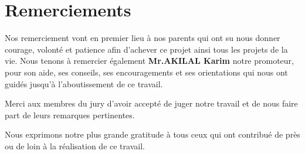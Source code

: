 \chapter*{Remerciements}
\thispagestyle{empty}
\begin{it}
\begin{center}
  Nos remerciement vont en premier lieu  à nos parents qui ont su nous donner courage, volonté et patience afin d'achever ce projet ainsi tous les projets de la vie.\newline
  \newline
  Nous tenons à remercier également  \textbf{ Mr.AKILAL Karim} notre promoteur, pour son aide, ses conseils, ses encouragements et ses orientations qui nous ont guidés jusqu’à l’aboutissement de ce travail. \newline
  \newline
  
  Merci aux membres du jury d’avoir accepté de juger notre travail et de nous faire part de leurs remarques pertinentes.
\newline

Nous exprimons notre plus grande gratitude à tous ceux qui ont contribué de près ou de loin à la réalisation de ce travail.

  
\end{center}
\end{it}
